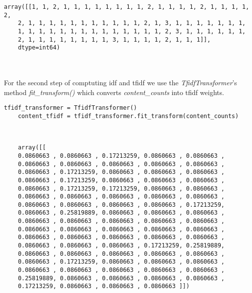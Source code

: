 \documentclass[a4paper, 11pt,titlepage,oneside,openany]{book}
\begin{document}
\noindent
\begin{minipage}{\linewidth}
\begin{lstlisting}
array([[1, 1, 2, 1, 1, 1, 1, 1, 1, 1, 1, 2, 1, 1, 1, 1, 2, 1, 1, 1, 1, 2,
	2, 1, 1, 1, 1, 1, 1, 1, 1, 1, 1, 1, 2, 1, 3, 1, 1, 1, 1, 1, 1, 1,
	1, 1, 1, 1, 1, 1, 1, 1, 1, 1, 1, 1, 1, 1, 2, 3, 1, 1, 1, 1, 1, 1,
	2, 1, 1, 1, 1, 1, 1, 1, 1, 3, 1, 1, 1, 1, 2, 1, 1, 1]],
	dtype=int64)
\end{lstlisting}
\end{minipage} \\
\\ For the second step of comptuting \gls{idf} and \gls{tfidf} we use the \textit{TfidfTransformer}'s method \textit{fit\_transform()} which converts \textit{content\_counts} into \gls{tfidf} weights. \\
\noindent
\begin{minipage}{\linewidth}
	\begin{lstlisting}[frame=single]
	tfidf_transformer = TfidfTransformer()
	content_tfidf = tfidf_transformer.fit_transform(content_counts)
	\end{lstlisting}
\end{minipage} \\
\noindent
\begin{minipage}{\linewidth}
\begin{lstlisting}
	array([[
	0.0860663 , 0.0860663 , 0.17213259, 0.0860663 , 0.0860663 ,
	0.0860663 , 0.0860663 , 0.0860663 , 0.0860663 , 0.0860663 ,
	0.0860663 , 0.17213259, 0.0860663 , 0.0860663 , 0.0860663 ,
	0.0860663 , 0.17213259, 0.0860663 , 0.0860663 , 0.0860663 ,
	0.0860663 , 0.17213259, 0.17213259, 0.0860663 , 0.0860663 ,
	0.0860663 , 0.0860663 , 0.0860663 , 0.0860663 , 0.0860663 ,
	0.0860663 , 0.0860663 , 0.0860663 , 0.0860663 , 0.17213259,
	0.0860663 , 0.25819889, 0.0860663 , 0.0860663 , 0.0860663 ,
	0.0860663 , 0.0860663 , 0.0860663 , 0.0860663 , 0.0860663 ,
	0.0860663 , 0.0860663 , 0.0860663 , 0.0860663 , 0.0860663 ,
	0.0860663 , 0.0860663 , 0.0860663 , 0.0860663 , 0.0860663 ,
	0.0860663 , 0.0860663 , 0.0860663 , 0.17213259, 0.25819889,
	0.0860663 , 0.0860663 , 0.0860663 , 0.0860663 , 0.0860663 ,
	0.0860663 , 0.17213259, 0.0860663 , 0.0860663 , 0.0860663 ,
	0.0860663 , 0.0860663 , 0.0860663 , 0.0860663 , 0.0860663 ,
	0.25819889, 0.0860663 , 0.0860663 , 0.0860663 , 0.0860663 ,
	0.17213259, 0.0860663 , 0.0860663 , 0.0860663 ]])
\end{lstlisting}
\end{minipage}
\newpage
\end{document}
